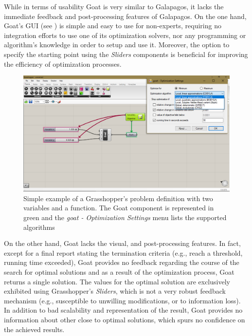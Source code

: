 While in terms of usability Goat is very similar to Galapagos, it lacks the immediate feedback and post-processing features of Galapagos. On the one hand, Goat's \ac{GUI} (see ) is simple and easy to use for non-experts, requiring no integration efforts to use one of its optimization solvers, nor any programming or algorithm's knowledge in order to setup and use it. Moreover, the option to specify the starting point using the \textit{Sliders} components is beneficial for improving the efficiency of optimization processes.

\begin{figure}
	\centering
	\includegraphics[width=1\textwidth]{Images/Background/Goat/general-view.png}
	\caption[Goat optimization plug-in menus]{Simple example of a Grasshopper's problem definition with two variables and a function. The Goat component is represented in green and the \textit{goat - Optimization Settings} menu lists the supported algorithms}
	\label{fig:goat}
\end{figure}

On the other hand, Goat lacks the visual, and post-processing features. In fact, except for a final report stating the termination criteria (e.g., reach a threshold, running time exceeded), Goat provides no feedback regarding the course of the search for optimal solutions and as a result of the optimization process, Goat returns a single solution. The values for the optimal solution are exclusively exhibited using Grasshopper's \textit{Sliders}, which is not a very robust feedback mechanism (e.g., susceptible to unwilling modifications, or to information loss). In addition to bad scalability and representation of the result, Goat provides no information about other close to optimal solutions, which spurs no confidence on the achieved results.
	
